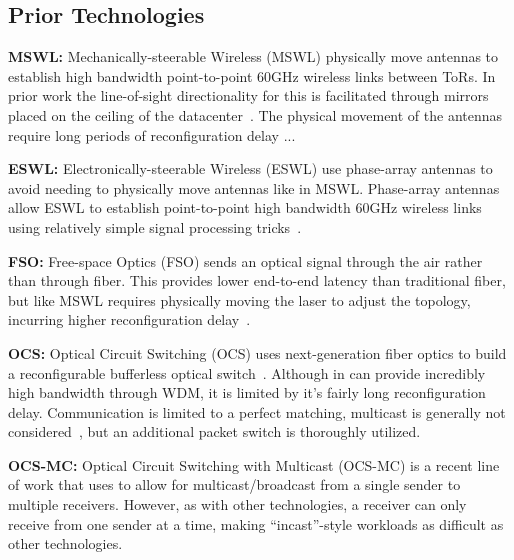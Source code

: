 \subsection{Prior Technologies}
\label{sec:prior_technologies}


{\bf MSWL:} Mechanically-steerable Wireless (MSWL) physically move antennas to
establish high bandwidth point-to-point 60GHz wireless links between ToRs. In
prior work the line-of-sight directionality for this is facilitated through
mirrors placed on the ceiling of the datacenter~\cite{mirormiror}. The physical
movement of the antennas require long periods of reconfiguration delay
...

{\bf ESWL:} Electronically-steerable Wireless (ESWL) use phase-array antennas to
avoid needing to physically move antennas like in MSWL. Phase-array antennas
allow ESWL to establish point-to-point high bandwidth 60GHz wireless links using
relatively simple signal processing tricks~\cite{flyways}. 

{\bf FSO:} Free-space Optics (FSO) sends an optical signal through the air
rather than through fiber. This provides lower end-to-end latency than
traditional fiber, but like MSWL requires physically moving the laser to adjust
the topology, incurring higher reconfiguration delay~\cite{firefly}. 

{\bf OCS:} Optical Circuit Switching (OCS) uses next-generation fiber optics to
build a reconfigurable bufferless optical switch~\cite{helios, c-through,
  mordia, reactor}. Although in can provide incredibly high bandwidth through
WDM, it is limited by it's fairly long reconfiguration delay. Communication is
limited to a perfect matching, multicast is generally not
considered~\cite{solstice}, but an additional packet switch is thoroughly
utilized. 

{\bf OCS-MC:} Optical Circuit Switching with Multicast (OCS-MC) is a recent line
of work that uses  to allow for multicast/broadcast from a single
sender to multiple receivers. However, as with other technologies, a receiver
can only receive from one sender at a time, making ``incast''-style workloads as
difficult as other technologies. 


